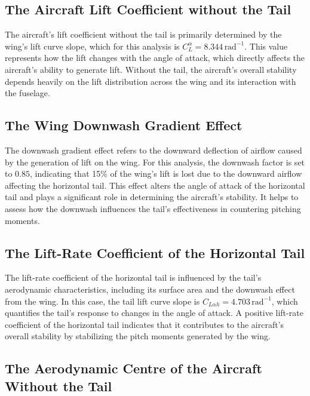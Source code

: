 \documentclass[12pt]{report}
\begin{document}
\subsection{The Aircraft Lift Coefficient without the Tail}

The aircraft's lift coefficient without the tail is primarily determined by the wing's lift curve slope, which for this analysis is \( C_L^\alpha = 8.344 \, \text{rad}^{-1} \). This value represents how the lift changes with the angle of attack, which directly affects the aircraft's ability to generate lift. Without the tail, the aircraft's overall stability depends heavily on the lift distribution across the wing and its interaction with the fuselage.

\subsection{The Wing Downwash Gradient Effect}

The downwash gradient effect refers to the downward deflection of airflow caused by the generation of lift on the wing. For this analysis, the downwash factor is set to \( 0.85 \), indicating that 15\% of the wing's lift is lost due to the downward airflow affecting the horizontal tail. This effect alters the angle of attack of the horizontal tail and plays a significant role in determining the aircraft’s stability. It helps to assess how the downwash influences the tail's effectiveness in countering pitching moments.

\subsection{The Lift-Rate Coefficient of the Horizontal Tail}

The lift-rate coefficient of the horizontal tail is influenced by the tail’s aerodynamic characteristics, including its surface area and the downwash effect from the wing. In this case, the tail lift curve slope is \( C_{L \alpha h} = 4.703 \, \text{rad}^{-1} \), which quantifies the tail's response to changes in the angle of attack. A positive lift-rate coefficient of the horizontal tail indicates that it contributes to the aircraft's overall stability by stabilizing the pitch moments generated by the wing.

\subsection{The Aerodynamic Centre of the Aircraft Without the Tail}
\end{document}
